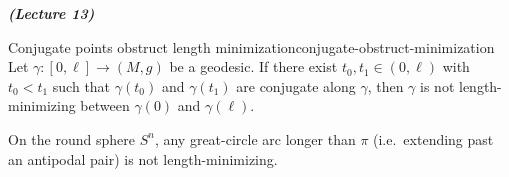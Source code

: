 


\vspace{0.4cm}\emph{\textbf{(Lecture 13)}}\\



\begin{colortheo}{Conjugate points obstruct length minimization}{conjugate-obstruct-minimization}
Let $\gamma \colon [0, \ell] \to (M, g)$ be a geodesic. If there exist $t_0, t_1 \in (0, \ell)$ with $t_0 < t_1$ such that $\gamma(t_0)$ and $\gamma(t_1)$ are conjugate along $\gamma$, then $\gamma$ is not length-minimizing between $\gamma(0)$ and $\gamma(\ell)$.
\end{colortheo}

\begin{colexample}{}{}
On the round sphere $S^n$, any great-circle arc longer than $\pi$ (i.e.\ extending past an antipodal pair) is not length-minimizing.
\end{colexample}


